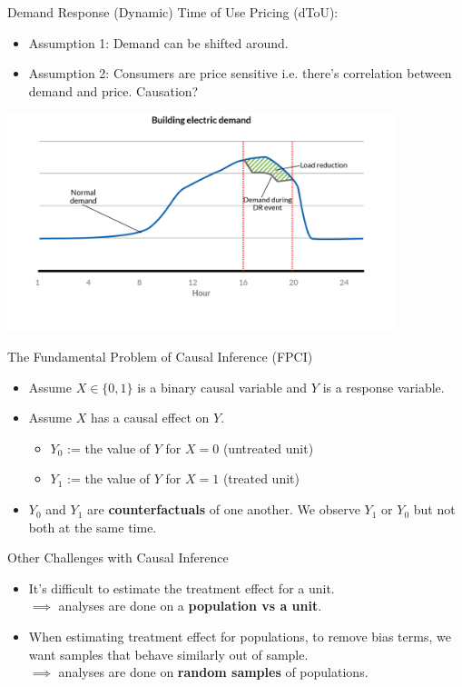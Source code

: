 \documentclass{beamer}
\begin{document}
\begin{frame}{Demand Response}
  (Dynamic) Time of Use Pricing (dToU):
  \begin{itemize}
    \item Assumption 1: Demand can be shifted around.
    \item Assumption 2: Consumers are price sensitive i.e. there's correlation between demand and price. Causation?
  \end{itemize}
  \vspace{0.2cm}
  \centering
  \includegraphics[width=0.85\textwidth]{images/demand-response.png}
\end{frame}

\begin{frame}{The Fundamental Problem of Causal Inference (FPCI)}
  \begin{itemize}
    \item<+-> Assume $X \in\{0,1\}$ is a binary causal variable and $Y$ is a response variable.
    \item<+-> Assume $X$ has a causal effect on $Y$.
    \begin{itemize}
      \item $Y_0$ := the value of $Y$ for $X=0$ (untreated unit)
      \item $Y_1$ := the value of $Y$ for $X=1$ (treated unit)
    \end{itemize}
    \item<+-> $Y_0$ and $Y_1$ are \textbf{counterfactuals} of one another. We observe $Y_1$ or $Y_0$ but not both at the same time.
  \end{itemize}
\end{frame}

\begin{frame}{Other Challenges with Causal Inference}
  \begin{itemize}
    \item<+-> It's difficult to estimate the treatment effect for a unit. \\
    \indent $\implies$ analyses are done on a \textbf{population vs a unit}.
    \item<+-> When estimating treatment effect for populations, to remove bias terms, we want samples that behave similarly out of sample. \\
    \indent $\implies$ analyses are done on \textbf{random samples} of populations.
  \end{itemize}
\end{frame}
\end{document}
